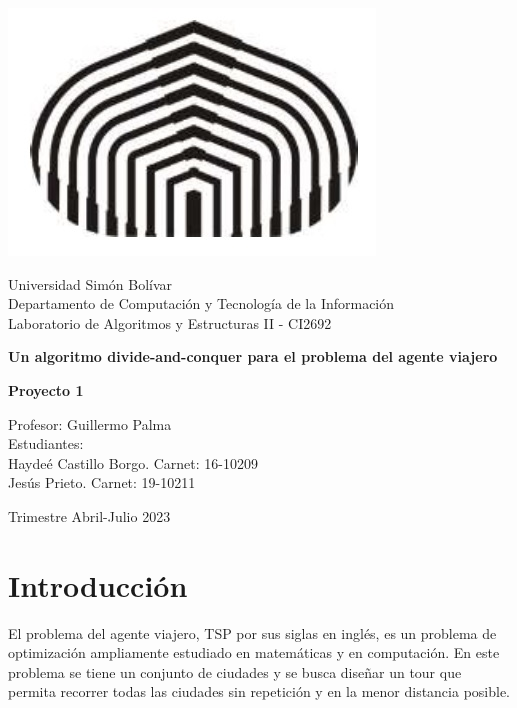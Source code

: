\documentclass[titlepage]{article}
\begin{document}
	\begin{titlepage}
		\centering
		\includegraphics*[scale=0.2]{logo usb.jpg}
		
		\vspace{0.5cm}		
		
		\large 
		Universidad Sim\'on Bol\'ivar\\
		Departamento de Computaci\'on y Tecnolog\'ia de la Informaci\'on\\
		Laboratorio de Algoritmos y Estructuras II - CI2692
		
		\vspace{7cm}
		
		\LARGE
		\textbf{Un algoritmo divide-and-conquer para
		el problema del agente viajero}
		
		\vspace{0.5cm}
		
		\textbf{Proyecto 1}
		
		\vspace{5cm}
		
		\large
		
		Profesor: Guillermo Palma\\
		Estudiantes:\\
		Hayde\'e Castillo Borgo. Carnet: 16-10209\\
		Jes\'us Prieto. Carnet: 19-10211
		
		\vspace{5cm}
		
		Trimestre Abril-Julio 2023
	\end{titlepage}
	
	\section{Introducci\'on}
	
	El problema del agente viajero, TSP por sus siglas en ingl\'es, es un problema de optimizaci\'on ampliamente estudiado en matem\'aticas y en computaci\'on. En este problema se tiene un conjunto de ciudades y se busca diseñar un tour que permita recorrer todas las ciudades sin repetici\'on y en la menor distancia posible.\\
	
\end{document}
